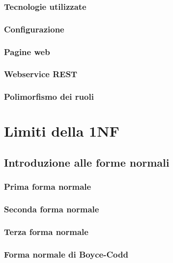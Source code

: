 \documentclass[10pt,twoside,cucitura]{toptesi}
\begin{document}
\section{Tecnologie utilizzate}


\section{Configurazione}


\section{Pagine web}
\label{sec:pagineWeb}


\section{Webservice REST}


\section{Polimorfismo dei ruoli}
\label{sec:polimorfismo}


\part{Limiti della 1NF}

\chapter{Introduzione alle forme normali}

\section{Prima forma normale}
\section{Seconda forma normale}
\section{Terza forma normale}
\section{Forma normale di Boyce-Codd}
\end{document}

